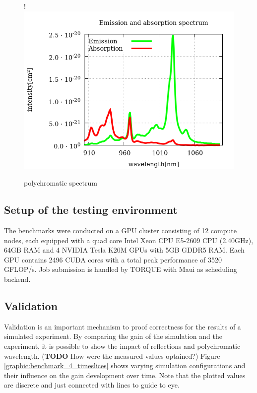 \begin{figure}[H]
  \centerline{
     {!} {\includegraphics{plot/sigma.png}}
  }
  \caption{polychromatic spectrum}
  \label{plot:polychromatic_spectrum}
\end{figure}

\subsection{Setup of the testing environment}
\label{subsec:testingEnvironment}

The benchmarks were conducted on a GPU cluster consisting of 12 compute nodes,
each equipped with a quad core Intel Xeon CPU E5-2609 CPU (2.40GHz), 64GB RAM
and 4 NVIDIA Tesla K20M GPUs with 5GB GDDR5 RAM. Each GPU contains 2496 CUDA cores with a total
peak performance of 3520 GFLOP/s. Job submission is handled by TORQUE\cite{torque} 
with Maui\cite{maui} as scheduling backend. 


\subsection{Validation}
\label{subsec:validation}
Validation is an important mechanism to proof correctness for
the results of a simulated experiment. By comparing the gain 
of the simulation and the experiment, 
it is possible to show the impact of reflections and polychromatic
wavelength. (\textbf{TODO} How were the measured values optained?) Figure \ref{graphic:benchmark_4_timeslices} shows
varying simulation configurations and their influence on the
gain development over time. Note that the plotted values are
discrete and just connected with lines to guide to eye.

